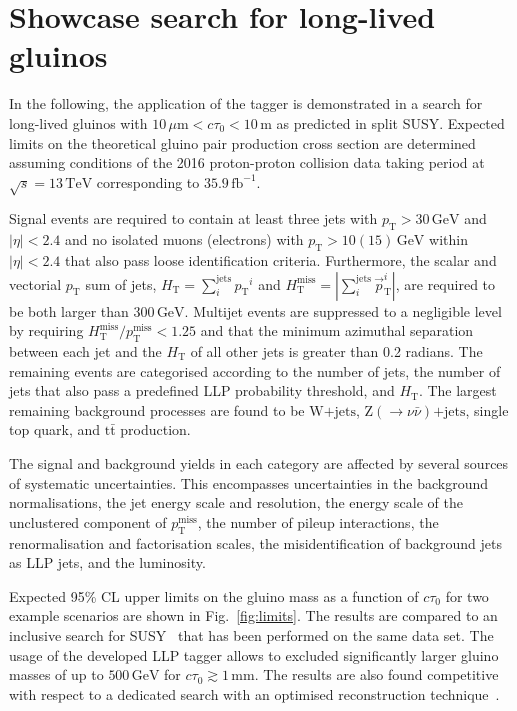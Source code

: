 \documentclass{webofc}
\newcommand{\ctau}{\ensuremath{c\tau_{0}}\xspace}
\newcommand{\pt}{\ensuremath{p_\textrm{T}}\xspace}
\newcommand{\jht}{\ensuremath{H_\textrm{T}}\xspace}
\newcommand{\jmht}{\ensuremath{H_\textrm{T}^\textrm{miss}}\xspace}
\newcommand{\met}{\ensuremath{p_\textrm{T}^\textrm{miss}}\xspace}
\newcommand{\ttbar}{\ensuremath{\textrm{t}\bar{\textrm{t}}}\xspace}
\newcommand{\wjets}{\ensuremath{\textrm{W+jets}}\xspace}
\newcommand{\znunu}{\ensuremath{\textrm{Z}(\to\nu\bar{\nu})\textrm{+jets}}\xspace}
\begin{document}
\section{Showcase search for long-lived gluinos}
\label{showcase}

In the following, the application of the tagger is demonstrated in a search for long-lived gluinos with $10\,\mu\textrm{m}<\ctau<10\,\textrm{m}$ as predicted in split SUSY. Expected limits on the theoretical gluino pair production cross section are determined assuming conditions of the 2016 proton-proton collision data taking period at $\sqrt{s}=13\,\textrm{TeV}$ corresponding to $35.9\,\textrm{fb}^{-1}$.

Signal events are required to contain at least three jets with $\pt>30\,\textrm{GeV}$ and $|\eta|<2.4$ and no isolated muons (electrons) with $\pt>10(15)\,\textrm{GeV}$ within $|\eta|<2.4$ that also pass loose identification criteria. Furthermore, the scalar and vectorial \pt sum of jets, $\jht=\sum_{i}^\textrm{jets}\pt^{i}$ and $\jmht=|\sum_{i}^\textrm{jets}\vec{p}_\textrm{T}^{i}|$, are required to be both larger than $300\,\textrm{GeV}$. Multijet events are suppressed to a negligible level by requiring $\jmht/\met<1.25$ and that the minimum azimuthal separation between each jet and the $\jht$ of all other jets is greater than 0.2 radians. The remaining events are categorised according to the number of jets, the number of jets that also pass a predefined LLP probability threshold, and \jht. The largest remaining background processes are found to be \wjets, \znunu, single top quark, and \ttbar production. 

The signal and background yields in each category are affected by several sources of systematic uncertainties. This encompasses uncertainties in the background normalisations, the jet energy scale and resolution, the energy scale of the unclustered component of \met, the number of pileup interactions, the renormalisation and factorisation scales, the misidentification of background jets as LLP jets, and the luminosity. 

Expected 95\% CL upper limits on the gluino mass as a function of \ctau for two example scenarios are shown in Fig.~\ref{fig:limits}. The results are compared to an inclusive search for SUSY~\cite{refsearch} that has been performed on the same data set. The usage of the developed LLP tagger allows to excluded significantly larger gluino masses of up to $500\,\textrm{GeV}$ for $\ctau\gtrsim1\,\textrm{mm}$. The results are also found competitive with respect to a dedicated search with an optimised reconstruction technique~\cite{atlasref}.
 
\end{document}
